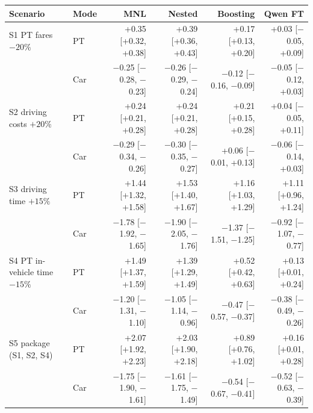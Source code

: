 \begin{tabular}{llrrrr}
\toprule
Scenario & Mode & MNL & Nested & Boosting & Qwen FT \\
\midrule
S1 PT fares $-20\%$ & PT & +0.35 [+0.32, +0.38] & +0.39 [+0.36, +0.43] & +0.17 [+0.13, +0.20] & +0.03 [$-$0.05, +0.09] \\
 & Car & $-$0.25 [$-$0.28, $-$0.23] & $-$0.26 [$-$0.29, $-$0.24] & $-$0.12 [$-$0.16, $-$0.09] & $-$0.05 [$-$0.12, +0.03] \\
\midrule
S2 driving costs $+20\%$ & PT & +0.24 [+0.21, +0.28] & +0.24 [+0.21, +0.28] & +0.21 [+0.15, +0.28] & +0.04 [$-$0.05, +0.11] \\
 & Car & $-$0.29 [$-$0.34, $-$0.26] & $-$0.30 [$-$0.35, $-$0.27] & +0.06 [$-$0.01, +0.13] & $-$0.06 [$-$0.14, +0.03] \\
\midrule
S3 driving time $+15\%$ & PT & +1.44 [+1.32, +1.58] & +1.53 [+1.40, +1.67] & +1.16 [+1.03, +1.29] & +1.11 [+0.96, +1.24] \\
 & Car & $-$1.78 [$-$1.92, $-$1.65] & $-$1.90 [$-$2.05, $-$1.76] & $-$1.37 [$-$1.51, $-$1.25] & $-$0.92 [$-$1.07, $-$0.77] \\
\midrule
S4 PT in-vehicle time $-15\%$ & PT & +1.49 [+1.37, +1.59] & +1.39 [+1.29, +1.49] & +0.52 [+0.42, +0.63] & +0.13 [+0.01, +0.24] \\
 & Car & $-$1.20 [$-$1.31, $-$1.10] & $-$1.05 [$-$1.14, $-$0.96] & $-$0.47 [$-$0.57, $-$0.37] & $-$0.38 [$-$0.49, $-$0.26] \\
\midrule
S5 package (S1, S2, S4) & PT & +2.07 [+1.92, +2.23] & +2.03 [+1.90, +2.18] & +0.89 [+0.76, +1.02] & +0.16 [+0.01, +0.28] \\
 & Car & $-$1.75 [$-$1.90, $-$1.61] & $-$1.61 [$-$1.75, $-$1.49] & $-$0.54 [$-$0.67, $-$0.41] & $-$0.52 [$-$0.63, $-$0.39] \\
\bottomrule
\end{tabular}
